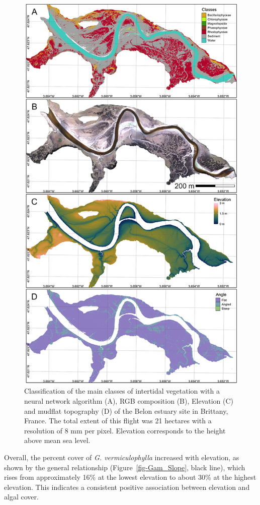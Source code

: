 \documentclass[
  letterpaper,
  11pt,
  english,
  singlespacing,
  headsepline]{MastersDoctoralThesis}
\begin{document}
\begin{spacing}{1.5}
\begin{figure}
{\includegraphics[width=0.8\linewidth,height=\textheight,keepaspectratio]{Chapter4/Figs/Belon_maps.png}

}

\caption{\label{fig-Belon}Classification of the main classes of
intertidal vegetation with a neural network algorithm (A), RGB
composition (B), Elevation (C) and mudflat topography (D) of the Belon
estuary site in Brittany, France. The total extent of this flight was 21
hectares with a resolution of 8 mm per pixel. Elevation corresponds to
the height above mean sea level.}

\end{figure}%

Overall, the percent cover of \emph{G. vermiculophylla} increased with
elevation, as shown by the general relationship
(Figure~\ref{fig-Gam_Slope}, black line), which rises from approximately
16\% at the lowest elevation to about 30\% at the highest elevation.
This indicates a consistent positive association between elevation and
algal cover.


\end{spacing}
\end{document}
